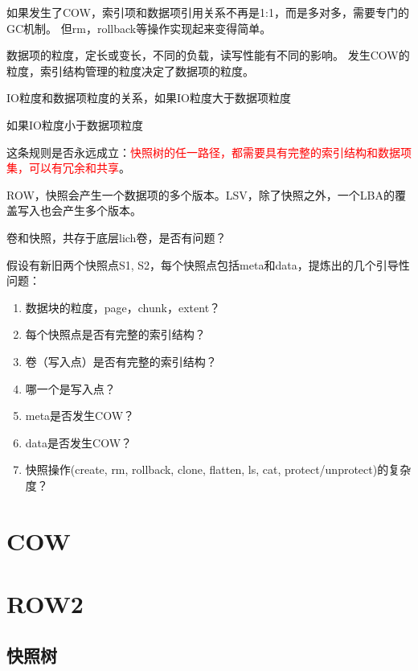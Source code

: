 如果发生了COW，索引项和数据项引用关系不再是1:1，而是多对多，需要专门的GC机制。
但rm，rollback等操作实现起来变得简单。

数据项的粒度，定长或变长，不同的负载，读写性能有不同的影响。
发生COW的粒度，索引结构管理的粒度决定了数据项的粒度。

IO粒度和数据项粒度的关系，如果IO粒度大于数据项粒度

如果IO粒度小于数据项粒度

这条规则是否永远成立：\textcolor{red}{快照树的任一路径，都需要具有完整的索引结构和数据项集，可以有冗余和共享}。


ROW，快照会产生一个数据项的多个版本。LSV，除了快照之外，一个LBA的覆盖写入也会产生多个版本。

卷和快照，共存于底层lich卷，是否有问题？

\begin{tcolorbox}

假设有新旧两个快照点S1, S2，每个快照点包括meta和data，提炼出的几个引导性问题：

\begin{enumerate}
    \item 数据块的粒度，page，chunk，extent？
    \item 每个快照点是否有完整的索引结构？
    \item 卷（写入点）是否有完整的索引结构？
    \item 哪一个是写入点？
    \item meta是否发生COW？
    \item data是否发生COW？
    \item 快照操作(create, rm, rollback, clone, flatten, ls, cat, protect/unprotect)的复杂度？
\end{enumerate}

\end{tcolorbox}

\section{COW}

\section{ROW2}

\subsection{快照树}

